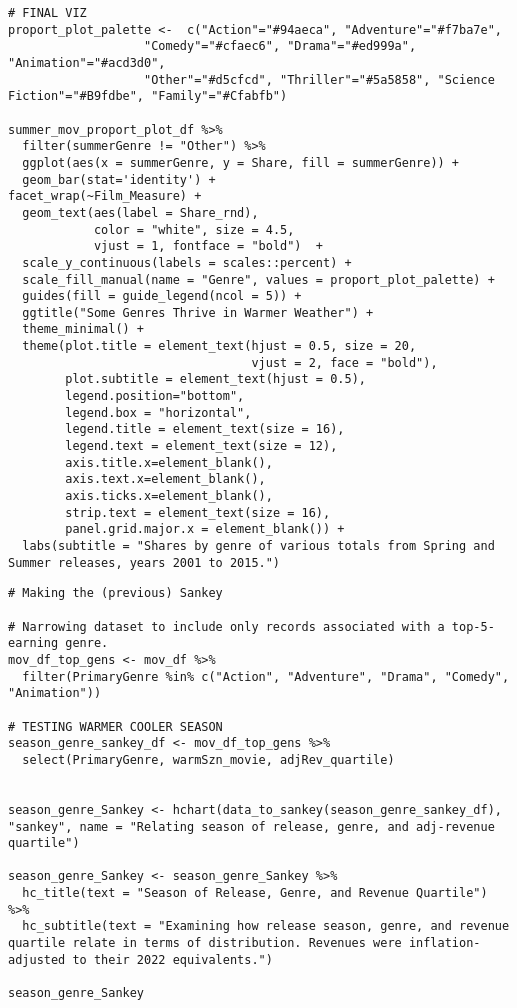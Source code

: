 \begin{lstlisting}
# FINAL VIZ
proport_plot_palette <-  c("Action"="#94aeca", "Adventure"="#f7ba7e",
                   "Comedy"="#cfaec6", "Drama"="#ed999a", "Animation"="#acd3d0",
                   "Other"="#d5cfcd", "Thriller"="#5a5858", "Science Fiction"="#B9fdbe", "Family"="#Cfabfb")

summer_mov_proport_plot_df %>%
  filter(summerGenre != "Other") %>%
  ggplot(aes(x = summerGenre, y = Share, fill = summerGenre)) + 
  geom_bar(stat='identity') + 
facet_wrap(~Film_Measure) +
  geom_text(aes(label = Share_rnd),
            color = "white", size = 4.5,
            vjust = 1, fontface = "bold")  +
  scale_y_continuous(labels = scales::percent) + 
  scale_fill_manual(name = "Genre", values = proport_plot_palette) +
  guides(fill = guide_legend(ncol = 5)) +
  ggtitle("Some Genres Thrive in Warmer Weather") +
  theme_minimal() +
  theme(plot.title = element_text(hjust = 0.5, size = 20, 
                                  vjust = 2, face = "bold"),
        plot.subtitle = element_text(hjust = 0.5),
        legend.position="bottom",
        legend.box = "horizontal",
        legend.title = element_text(size = 16),
        legend.text = element_text(size = 12),
        axis.title.x=element_blank(),
        axis.text.x=element_blank(),
        axis.ticks.x=element_blank(),
        strip.text = element_text(size = 16),
        panel.grid.major.x = element_blank()) +
  labs(subtitle = "Shares by genre of various totals from Spring and Summer releases, years 2001 to 2015.")
\end{lstlisting}

\begin{lstlisting}
# Making the (previous) Sankey

# Narrowing dataset to include only records associated with a top-5-earning genre.
mov_df_top_gens <- mov_df %>%
  filter(PrimaryGenre %in% c("Action", "Adventure", "Drama", "Comedy", "Animation"))

# TESTING WARMER COOLER SEASON
season_genre_sankey_df <- mov_df_top_gens %>%
  select(PrimaryGenre, warmSzn_movie, adjRev_quartile)


season_genre_Sankey <- hchart(data_to_sankey(season_genre_sankey_df), "sankey", name = "Relating season of release, genre, and adj-revenue quartile")

season_genre_Sankey <- season_genre_Sankey %>%
  hc_title(text = "Season of Release, Genre, and Revenue Quartile") %>%
  hc_subtitle(text = "Examining how release season, genre, and revenue quartile relate in terms of distribution. Revenues were inflation-adjusted to their 2022 equivalents.")

season_genre_Sankey
\end{lstlisting}

